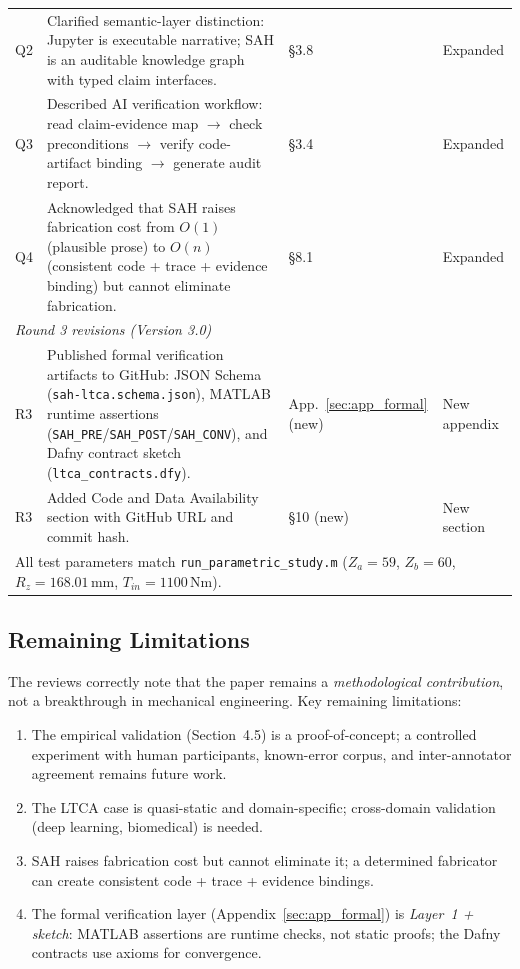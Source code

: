\documentclass{article}
\begin{document}
\begin{table}[t]
\begin{tabular}{p{1.2cm}p{4.8cm}p{3.5cm}p{3.5cm}}
Q2 & Clarified semantic-layer distinction: Jupyter is executable narrative; SAH is an auditable knowledge graph with typed claim interfaces. & \S3.8 & Expanded \\
Q3 & Described AI verification workflow: read claim-evidence map $\to$ check preconditions $\to$ verify code-artifact binding $\to$ generate audit report. & \S3.4 & Expanded \\
Q4 & Acknowledged that SAH raises fabrication cost from $O(1)$ (plausible prose) to $O(n)$ (consistent code + trace + evidence binding) but cannot eliminate fabrication. & \S8.1 & Expanded \\
\midrule
\multicolumn{4}{l}{\textit{Round 3 revisions (Version 3.0)}} \\
R3 & Published formal verification artifacts to GitHub: JSON Schema (\texttt{sah-ltca.schema.json}), MATLAB runtime assertions (\texttt{SAH\_PRE}/\texttt{SAH\_POST}/\texttt{SAH\_CONV}), and Dafny contract sketch (\texttt{ltca\_contracts.dfy}). & App.~\ref{sec:app_formal} (new) & New appendix \\
R3 & Added Code and Data Availability section with GitHub URL and commit hash. & \S10 (new) & New section \\
\midrule
\multicolumn{4}{l}{\footnotesize All test parameters match \texttt{run\_parametric\_study.m} ($Z_a\!=\!59$, $Z_b\!=\!60$, $R_z\!=\!168.01\,\mathrm{mm}$, $T_{in}\!=\!1100\,\mathrm{Nm}$).} \\
\bottomrule
\end{tabular}
\label{tab:revision_trace}
\end{table}

\subsection{Remaining Limitations}

The reviews correctly note that the paper remains a \emph{methodological contribution}, not a breakthrough in mechanical engineering. Key remaining limitations:
\begin{enumerate}[nosep]
    \item The empirical validation (Section~4.5) is a proof-of-concept; a controlled experiment with human participants, known-error corpus, and inter-annotator agreement remains future work.
    \item The LTCA case is quasi-static and domain-specific; cross-domain validation (deep learning, biomedical) is needed.
    \item SAH raises fabrication cost but cannot eliminate it; a determined fabricator can create consistent code + trace + evidence bindings.
    \item The formal verification layer (Appendix~\ref{sec:app_formal}) is \emph{Layer~1 + sketch}: MATLAB assertions are runtime checks, not static proofs; the Dafny contracts use axioms for convergence.
\end{enumerate}
\end{document}
